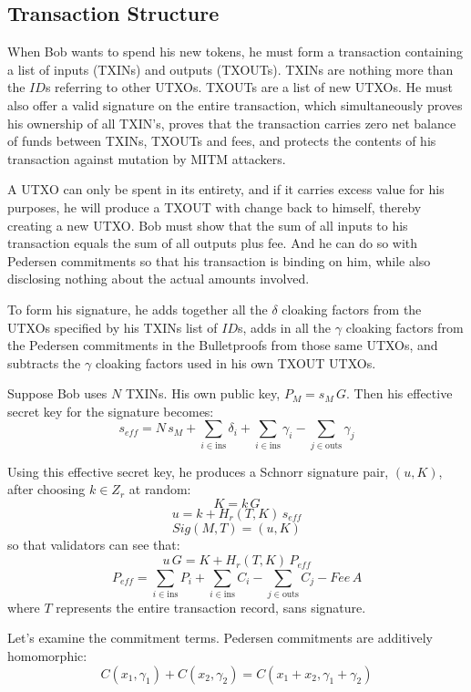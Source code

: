 \documentclass[a4paper, 10pt, conference]{ieeeconf}
\begin{document}
\subsection{Transaction Structure}

When Bob wants to spend his new tokens, he must form a transaction containing a list of inputs (TXINs) and outputs (TXOUTs). TXINs are nothing more than the $\mathit{ID}$s referring to other UTXOs. TXOUTs are a list of new UTXOs. He must also offer a valid signature on the entire transaction, which simultaneously proves his ownership of all TXIN's, proves that the transaction carries zero net balance of funds between TXINs, TXOUTs and fees, and protects the contents of his transaction against mutation by MITM attackers.

A UTXO can only be spent in its entirety, and if it carries excess value for his purposes, he will produce a TXOUT with change back to himself, thereby creating a new UTXO. Bob must show that the sum of all inputs to his transaction equals the sum of all outputs plus fee. And he can do so with Pedersen commitments so that his transaction is binding on him, while also disclosing nothing about the actual amounts involved.

To form his signature, he adds together all the $\delta$ cloaking factors from the UTXOs specified by his TXINs list of $\mathit{ID}$s, adds in all the $\gamma$ cloaking factors from the Pedersen commitments in the Bulletproofs from those same UTXOs, and subtracts the $\gamma$ cloaking factors used in his own TXOUT UTXOs. 

Suppose Bob uses $N$ TXINs. His own public key, $P_M = s_M \, G$. Then his effective secret key for the signature becomes:
$$s_{\mathit{eff}} = N \, s_M + \sum_{i \in \text{ins}} {\delta_i} + \sum_{i \in \text{ins}}{\gamma_i} - \sum_{j \in \text{outs}}{ \gamma_j}$$

Using this effective secret key, he produces a Schnorr signature pair, $(u, K)$, after choosing $k \in Z_r$ at random:
$$K = k \, G$$
$$u = k + H_r(T, K) \, s_{\mathit{eff}}$$
$$Sig(M,T) = (u, K)$$
so that validators can see that:
$$u \, G = K + H_r(T, K) \, P_{\mathit{eff}}$$
$$P_{\mathit{eff}} = \sum_{i \in \text{ins}}{P_i} + \sum_{i \in \text{ins}}{C_i} - \sum_{j \in \text{outs}}{C_j} - \mathit{Fee} \, A$$
where $T$ represents the entire transaction record, sans signature.

Let's examine the commitment terms. Pedersen commitments are additively homomorphic:
$$C(x_1, \gamma_1) + C(x_2, \gamma_2) = C(x_1 + x_2, \gamma_1 + \gamma_2)$$
\end{document}
